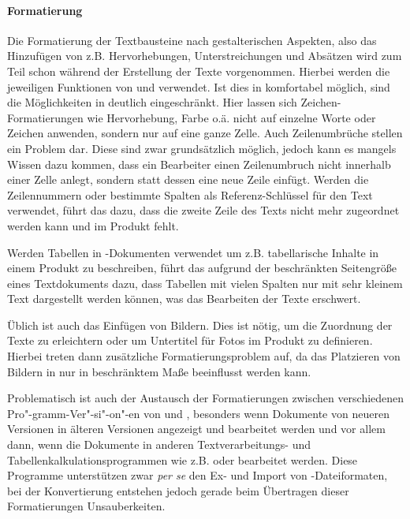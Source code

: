 \paragraph{Formatierung} Die Formatierung der Textbausteine nach gestalterischen Aspekten, also das Hinzufügen von z.B. Hervorhebungen, Unterstreichungen und Absätzen wird zum Teil schon während der Erstellung der Texte vorgenommen. Hierbei werden die jeweiligen Funktionen von  und  verwendet. Ist dies in  komfortabel möglich, sind die Möglichkeiten in  deutlich eingeschränkt. Hier lassen sich Zeichen-Formatierungen wie Hervorhebung, Farbe o.ä. nicht auf einzelne Worte oder Zeichen anwenden, sondern nur auf eine ganze Zelle. Auch Zeilenumbrüche stellen ein Problem dar. Diese sind zwar grundsätzlich möglich, jedoch kann es mangels Wissen dazu kommen, dass ein Bearbeiter einen Zeilenumbruch nicht innerhalb einer Zelle anlegt, sondern statt dessen eine neue Zeile einfügt. Werden die Zeilennummern oder bestimmte Spalten als Referenz-Schlüssel für den Text verwendet, führt das dazu, dass die zweite Zeile des Texts nicht mehr zugeordnet werden kann und im Produkt fehlt. 

Werden Tabellen in -Dokumenten verwendet um z.B. tabellarische Inhalte in einem Produkt zu beschreiben, führt das aufgrund der beschränkten Seitengröße eines Textdokuments dazu, dass Tabellen mit vielen Spalten nur mit sehr kleinem Text dargestellt werden können, was das Bearbeiten der Texte erschwert. 

Üblich ist auch das Einfügen von Bildern. Dies ist nötig, um die Zuordnung der Texte zu erleichtern oder um Untertitel für Fotos im Produkt zu definieren. Hierbei treten dann zusätzliche Formatierungsproblem auf, da das Platzieren von Bildern in  nur in beschränktem Maße beeinflusst werden kann. 

Problematisch ist auch der Austausch der Formatierungen zwischen verschiedenen Pro"-gramm-Ver"-si"-on"-en von  und , besonders wenn Dokumente von neueren Versionen in älteren Versionen angezeigt und bearbeitet werden und vor allem dann, wenn die Dokumente in anderen Textverarbeitungs- und Tabellenkalkulationsprogrammen wie z.B.   oder  bearbeitet werden. Diese Programme unterstützen zwar \emph{per se} den Ex- und Import von -Dateiformaten, bei der Konvertierung entstehen jedoch gerade beim Übertragen dieser Formatierungen Unsauberkeiten. 

